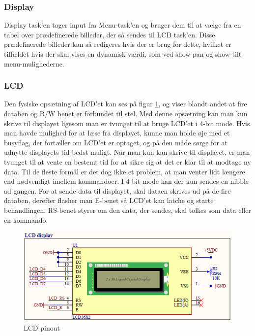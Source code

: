 \subsubsection{Display}

Display task'en tager input fra Menu-task'en og bruger dem til at vælge fra en tabel over prædefinerede billeder, der så sendes til LCD task'en. Disse prædefinerede billeder kan så redigeres hvis der er brug for dette, hvilket er tilfældet hvis der skal vises en dynamisk værdi, som ved show-pan og show-tilt menu-mulighederne.

\subsubsection{LCD}

Den fysiske opsætning af LCD'et kan ses på figur \ref{fig:LCD}, og viser blandt andet at fire databen og R/W benet er forbundet til stel. Med denne opsætning kan man kun skrive til displayet ligesom man er tvunget til at bruge LCD'et i 4-bit mode. Hvis man havde mulighed for at læse fra displayet, kunne man holde øje med et busyflag, der fortæller om LCD'et er optaget, og på den måde sørge for at udnytte displayets tid bedst muligt. Når man kun kan skrive til displayet, er man tvunget til at vente en bestemt tid for at sikre sig at det er klar til at modtage ny data. Til de fleste formål er det dog ikke et problem, at man venter lidt længere end nødvendigt imellem kommandoer. I 4-bit mode kan der kun sendes en nibble ad gangen. For at sende data til displayet, skal dataen skrives ud på de fire databen, derefter flasher man E-benet så LCD'et kan latche og starte behandlingen. RS-benet styrer om den data, der sendes, skal tolkes som data eller en kommando. 

\begin{figure}[ht]
			\begin{center}
			\includegraphics[scale=0.9]{Billeder/LCD.PNG}
			\end{center}
			\caption{LCD pinout}
			\label{fig:LCD}
\end{figure}

